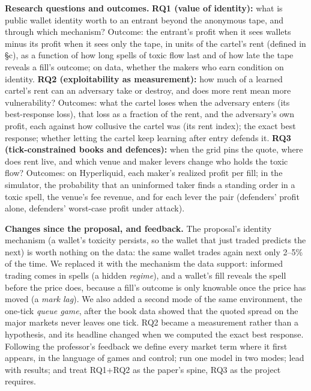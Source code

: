 \documentclass[10pt]{article}
\begin{document}
\textbf{Research questions and outcomes.} \textbf{RQ1 (value of identity):} what is public wallet identity worth to an entrant beyond the anonymous tape, and through which mechanism? Outcome: the entrant's profit when it sees wallets minus its profit when it sees only the tape, in units of the cartel's rent (defined in \S c), as a function of how long spells of toxic flow last and of how late the tape reveals a fill's outcome; on data, whether the makers who earn condition on identity. \textbf{RQ2 (exploitability as measurement):} how much of a learned cartel's rent can an adversary take or destroy, and does more rent mean more vulnerability? Outcomes: what the cartel loses when the adversary enters (its best-response loss), that loss as a fraction of the rent, and the adversary's own profit, each against how collusive the cartel was (its rent index); the exact best response; whether letting the cartel keep learning after entry defends it. \textbf{RQ3 (tick-constrained books and defences):} when the grid pins the quote, where does rent live, and which venue and maker levers change who holds the toxic flow? Outcomes: on Hyperliquid, each maker's realized profit per fill; in the simulator, the probability that an uninformed taker finds a standing order in a toxic spell, the venue's fee revenue, and for each lever the pair (defenders' profit alone, defenders' worst-case profit under attack).

\textbf{Changes since the proposal, and feedback.} The proposal's identity mechanism (a wallet's toxicity persists, so the wallet that just traded predicts the next) is worth nothing on the data: the same wallet trades again next only 2--5\% of the time. We replaced it with the mechanism the data support: informed trading comes in spells (a hidden \emph{regime}), and a wallet's fill reveals the spell before the price does, because a fill's outcome is only knowable once the price has moved (a \emph{mark lag}). We also added a second mode of the same environment, the one-tick \emph{queue game}, after the book data showed that the quoted spread on the major markets never leaves one tick. RQ2 became a measurement rather than a hypothesis, and its headline changed when we computed the exact best response. Following the professor's feedback we define every market term where it first appears, in the language of games and control; run one model in two modes; lead with results; and treat RQ1+RQ2 as the paper's spine, RQ3 as the project requires.
\end{document}
